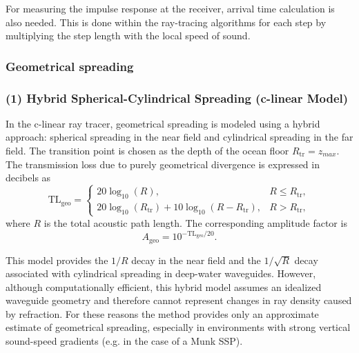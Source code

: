 \documentclass[fleqn]{jaes}
\begin{document}
For measuring the impulse response at the receiver, arrival time calculation is also needed. This is done within the ray-tracing algorithms for each step by multiplying the step length with the local speed of sound.
 
\subsubsection{Geometrical spreading}
\medskip

\subsubsection*{(1) Hybrid Spherical-Cylindrical Spreading (c-linear Model)}
In the c-linear ray tracer, geometrical spreading is modeled using
a hybrid approach: spherical spreading in the near field and cylindrical
spreading in the far field. The transition point is chosen as the depth of the ocean floor $R_{\text{tr}} = z_{max}$. The transmission loss due to purely geometrical divergence is expressed in decibels as
\[
\mathrm{TL}_{\text{geo}} =
\begin{cases}
20 \log_{10}(R), & R \le R_{\text{tr}}, \\[6pt]
20\log_{10}(R_{\text{tr}}) + 10\log_{10}(R - R_{\text{tr}}), & R > R_{\text{tr}},
\end{cases}
\]
where $R$ is the total acoustic path length. The corresponding amplitude factor is
\begin{equation}
    A_{\text{geo}} = 10^{-\mathrm{TL}_{\text{geo}}/20}.
\end{equation}

This model provides the $1/R$ decay in the near field and the
$1/\sqrt{R}$ decay associated with cylindrical spreading in deep-water
waveguides. However, although computationally efficient, this hybrid model assumes an idealized waveguide geometry and therefore cannot represent changes in ray density caused by refraction. For these reasons the method provides only an approximate estimate of geometrical spreading, especially in environments with strong vertical sound-speed gradients (e.g. in the case of a Munk SSP).
\end{document}
